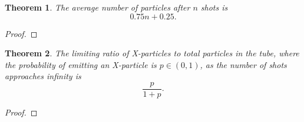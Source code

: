 \documentclass{article}
\newtheorem{theorem}{Theorem}
\begin{document}
\begin{theorem}
  The average number of particles after $n$ shots is \[
  0.75n + 0.25
  .\]
\end{theorem}
\begin{proof}
  
\end{proof}
\begin{theorem}
  The limiting ratio of X-particles to total particles in the tube, where the probability of emitting an X-particle is $p \in (0, 1)$, as the number of shots approaches infinity is \[
  \frac{p}{1+p}
  .\]
\end{theorem}
\begin{proof}

\end{proof}





\newpage
\inputminted{cpp}{ummrc.cpp}
\end{document}
